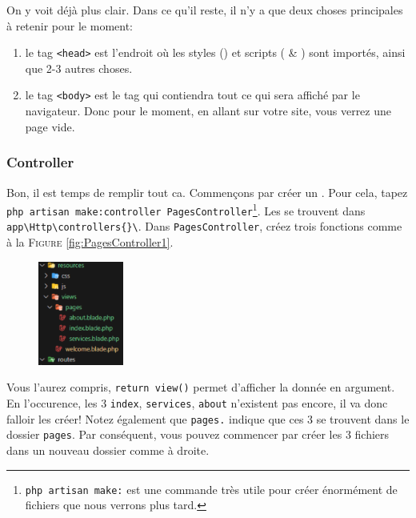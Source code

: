 On y voit déjà plus clair. Dans ce qu'il reste, il n'y a que deux choses principales à retenir pour le moment: 
\begin{enumerate}
    \item le tag \verb|<head>| est l'endroit où les styles (\css{}) et scripts (\jquery{}  \& \js{}) sont importés, ainsi que 2-{}3 autres choses.
    \item le tag \verb|<body>| est le tag qui contiendra tout ce qui sera affiché par le navigateur. Donc pour le moment, en allant sur votre site, vous verrez une page vide.
\end{enumerate}

\subsubsection[Controller][laravel.com/docs/10.x/controllers\#introduction]{Controller}
Bon, il est temps de remplir tout ca. Commençons par créer un \controller{}. Pour cela, tapez
\verb|php artisan make:controller PagesController|\footnote{\verb|php artisan make:| est une commande très utile pour créer énormément de fichiers que nous verrons plus tard.}. Les \controllers{} se trouvent dans \verb|app\Http\controllers{}\|. Dans \verb|PagesController|, créez trois fonctions comme à la \textsc{Figure }\ref{fig:PagesController1}.

\begin{figure}
    \vspace{-0.5cm}
    \includegraphics[width=0.25\textwidth]{figures-C1/3_premieres_views.pdf}
\end{figure}

Vous l'aurez compris, \verb|return view()| permet d'afficher la \view{} donnée en argument. En l'occurence, les 3 \views{} \verb|index|, \verb|services|, \verb|about| n'existent pas encore, il va donc falloir les créer! Notez également que \verb|pages.| indique que ces 3 \views{} se trouvent dans le dossier \verb|pages|. Par conséquent, vous pouvez commencer par créer les 3 fichiers dans un nouveau dossier comme à droite.

